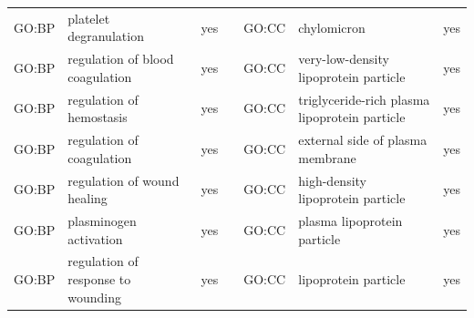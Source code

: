 \begin{longtable}{@{}lp{5cm}lllp{5cm}l@{}}
GO:BP           & platelet degranulation                                                                                                             & yes              &           & GO:CC           & chylomicron                                                                                                                                                            & yes              \\
GO:BP           & regulation of blood coagulation                                                                                                    & yes              &           & GO:CC           & very-low-density lipoprotein particle                                                                                                                                  & yes              \\
GO:BP           & regulation of hemostasis                                                                                                           & yes              &           & GO:CC           & triglyceride-rich plasma lipoprotein particle                                                                                                                          & yes              \\
GO:BP           & regulation of coagulation                                                                                                          & yes              &           & GO:CC           & external side of plasma membrane                                                                                                                                       & yes              \\
GO:BP           & regulation of wound healing                                                                                                        & yes              &           & GO:CC           & high-density lipoprotein particle                                                                                                                                      & yes              \\
GO:BP           & plasminogen activation                                                                                                             & yes              &           & GO:CC           & plasma lipoprotein particle                                                                                                                                            & yes              \\
GO:BP           & regulation of response to wounding                                                                                                 & yes              &           & GO:CC           & lipoprotein particle                                                                                                                                                   & yes              \\

\end{longtable}
